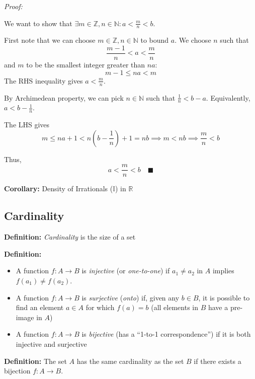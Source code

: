 \documentclass[12pt]{report}
\newcommand{\R}{\mathbb{R}}
\newcommand{\Z}{\mathbb{Z}}
\newcommand{\Q}{\mathbb{Q}}
\newcommand{\N}{\mathbb{N}}
\newcommand{\qed}{\quad \blacksquare}
\newenvironment*{tbox}[2][gray]{
    \begin{tcolorbox}[
        parbox=false,
        colback=#1!5!white,
        colframe=#1!75!black,
        breakable,
        title={#2}
    ]}
    {\end{tcolorbox}}
\begin{document}
        \begin{tbox}{\textbf{Theorem (Density of $\Q$ in $\R$):} For every two real numbers $a$ and $b$ with $a < b$, $\exists r \in \Q$ s.t. $a < r < b$}
            \emph{Proof:} 

            We want to show that $\exists m \in \Z, n \in \N: a < \frac{m}{n} < b$. 

            First note that we can choose $m \in \Z, n \in \N$ to bound $a$. We choose $n$ such that 
            \[\frac{m-1}{n} < a < \frac{m}{n}\]
            and $m$ to be the smallest integer greater than $na$: 
            \[m - 1 \leq na < m\] 
            The RHS inequality gives $a < \frac{m}{n}$. 

            By Archimedean property, we can pick $n \in \N$ such that $\frac{1}{n} < b - a$. Equivalently, $a < b - \frac{1}{n}$.

            The LHS gives 
            \[m \leq na + 1 < n(b - \frac{1}{n}) + 1 = nb \implies m < nb \implies \frac{m}{n} < b\]

            Thus, 
            \[a < \frac{m}{n} < b \qed\]
        \end{tbox}

        \textbf{Corollary:} Density of Irrationals ($\mathbb{I}$) in $\R$ 

    \subsection*{Cardinality}
        \textbf{Definition:} \emph{Cardinality} is the size of a set 

        \textbf{Definition:} 
        \begin{itemize}
            \item A function $f: A \to B$ is \emph{injective} (or \emph{one-to-one}) if $a_1 \neq a_2$ in $A$ implies $f(a_1) \neq f(a_2)$. 
            \item A function $f: A \to B$ is \emph{surjective} (\emph{onto}) if, given any $b \in B$, it is possible to find an element $a \in A$ for which $f(a)= b$ (all elements in $B$ have a pre-image in $A$)
            \item A function $f: A \to B$ is \emph{bijective} (has a ``1-to-1 correspondence'') if it is both injective and surjective
        \end{itemize}

        \textbf{Definition:} The set $A$ has the same cardinality as the set $B$ if there exists a bijection $f: A \to B$.
        
\end{document}
